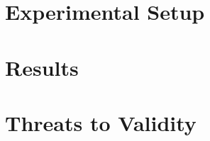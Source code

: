 \documentclass{article}
\begin{document}
\section{Experimental Setup}

\section{Results}

\section{Threats to Validity}

\end{document}
